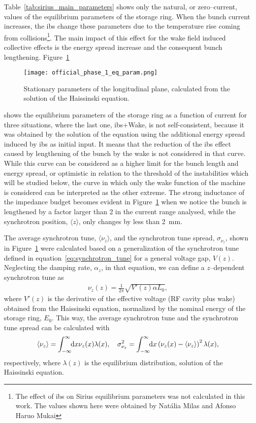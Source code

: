     Table~\ref{tab:sirius_main_parameters} shows only the natural, or zero--current, values of the equilibrium parameters of the storage ring. When the bunch current increases, the \gls{ibs} change these parameters due to the temperature rise coming from collisions\footnote{The effect of \gls{ibs} on Sirius equilibrium parameters was not  calculated in this work. The values shown here were obtained by Natália Milas and Afonso Haruo Mukai}. The main impact of this effect for the wake field induced collective effects is the energy spread increase and the consequent bunch lengthening.  Figure~\ref{fig:ph1_eq_param}
    \begin{figure}
        \centering
        \texttt{[image: official\_phase\_1\_eq\_param.png]}
        \caption{Stationary parameters of the longitudinal plane, calculated from the solution of the Haissinski equation.}
        \label{fig:ph1_eq_param}
    \end{figure}
    shows the equilibrium parameters of the storage ring as a function of current for three situations, where the last one, \gls{ibs}$+$Wake, is not self-consistent, because it was obtained by the solution of the \citeauthor{Haissinski1973} equation using the additional energy spread induced by \gls{ibs} as initial input. It means that the reduction of the \gls{ibs} effect caused by lengthening of the bunch by the wake is not considered in that curve. While this curve can be considered as a higher limit for the bunch length and energy spread, or optimistic in relation to the threshold of the instabilities which will be studied below, the curve in which only the wake function of the machine is considered can be interpreted as the other extreme. The strong inductance of the impedance budget becomes evident in Figure~\ref{fig:ph1_eq_param} when we notice the bunch is lengthened by a factor larger than \num{2} in the current range analysed, while the synchrotron position, $\langle z \rangle$, only changes by less than \SI{2}{\milli\meter}.

    The average synchrotron tune, $\langle \nu_z \rangle$, and the synchrotron tune spread, $\sigma_{\nu_z}$, shown in Figure~\ref{fig:ph1_eq_param} were calculated based on a generalization of the synchrotron tune defined in equation~\ref{eq:synchrotron_tune} for a general voltage gap, $V(z)$. Neglecting the damping rate, $\alpha_z$, in that equation, we can define a $z$--dependent synchrotron tune as
    \begin{align}
        \nu_z(z) = \frac{1}{2\pi}\sqrt{V'(z)\alpha L_0},
    \end{align}
    where $V'(z)$ is the derivative of the effective voltage (RF cavity plus wake) obtained from the Haissinski equation, normalized by the nominal energy of the storage ring, $E_0$. This way, the average synchrotron tune and the synchrotron tune spread can be calculated with
    \begin{align}
        \langle \nu_z \rangle = \int_{-\infty}^{\infty}\!\!\text{d}x \nu_z(x)\lambda(x),\quad
        \sigma_{\nu_z}^2 = \int_{-\infty}^{\infty}\!\!\text{d}x \left(\nu_z(x)-\langle \nu_z \rangle\right)^2\lambda(x),
    \end{align}
    respectively, where $\lambda(z)$ is the equilibrium distribution, solution of the Haissinski equation.

